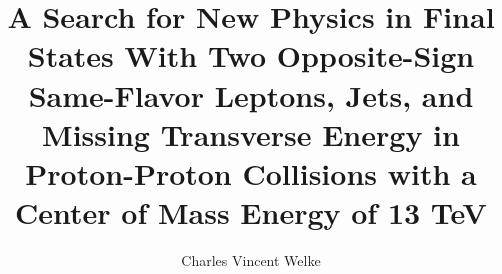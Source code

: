 \title{A Search for New Physics in Final States With Two Opposite-Sign Same-Flavor Leptons, Jets, and Missing Transverse Energy in Proton-Proton Collisions with a Center of Mass Energy of 13 TeV}

\author{Charles Vincent Welke}





